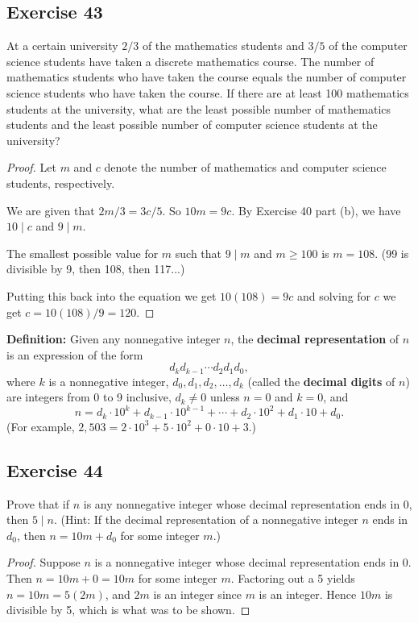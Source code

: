 \documentclass[14pt]{extarticle}
\newcommand{\cy}{\color{cyan}}
\begin{document}
\subsection{Exercise 43}
At a certain university $2/3$ of the mathematics students and $3/5$ of the computer science students have taken a discrete mathematics course. The number of mathematics students who have taken the course equals the number of computer science students who have taken the course. If there are at least 100 mathematics students at the university, what are the least possible number of mathematics students and the least possible number of computer science students at the university?

\begin{proof}
Let $m$ and $c$ denote the number of mathematics and computer science students, respectively.

We are given that $2m/3 = 3c/5$. So $10m = 9c$. By Exercise 40 part (b), we have $10 \mid c$ and $9 \mid m$.

The smallest possible value for $m$ such that $9 \mid m$ and $m \geq 100$ is $m = 108$. (99 is divisible by 9, then 108, then 117...)

Putting this back into the equation we get $10(108) = 9c$ and solving for $c$ we get $c = 10(108)/9 = 120$.
\end{proof}

\begin{tcolorbox}[colframe=cyan]
{\bf \cy Definition:} Given any nonnegative integer $n$, the {\bf decimal representation} of $n$ is an expression of the form 
\[
d_k d_{k-1} \cdots d_2d_1d_0,
\] 
where $k$ is a nonnegative integer, $d_0, d_1, d_2, \ldots, d_k$ (called the {\bf decimal digits} of $n$) are integers from 0 to 9 inclusive, $d_k \neq 0$ unless $n = 0$ and $k = 0$, and 
\[
n = d_k \cdot 10^k + d_{k-1} \cdot 10^{k-1} + \cdots + d_2 \cdot 10^2 + d_1 \cdot 10 + d_0. 
\]
(For example, $2,503 = 2\cdot 10^3 + 5\cdot 10^2 + 0\cdot 10 + 3$.)
\end{tcolorbox}

\subsection{Exercise 44}
Prove that if $n$ is any nonnegative integer whose decimal representation ends in 0, then $5\mid n$. (Hint: If the decimal representation of a nonnegative integer $n$ ends in $d_0$, then $n = 10m + d_0$ for some integer $m$.)

\begin{proof}
Suppose $n$ is a nonnegative integer whose decimal representation ends in 0. Then $n = 10m + 0 = 10m$ for
some integer $m$. Factoring out a 5 yields $n = 10m = 5(2m)$, and $2m$ is an integer since $m$ is an integer. Hence $10m$ is divisible by 5, which is what was to be shown.
\end{proof}
\end{document}
